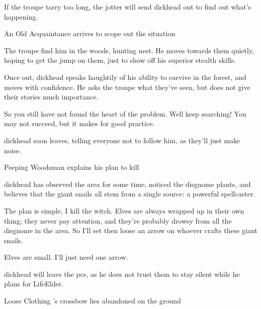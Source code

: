 
If the troupe tarry too long, the \gls{jotter} will send \gls{dickhead} out to find out what's happening.

{An Old Acquaintance}%
{ arrives to scope out the situation}%

The troupe find him in the woods, hunting  nest.
He moves towards them quietly, hoping to get the jump on them, just to show off his superior stealth \glspl{skill}.

Once out, \gls{dickhead} speaks haughtily of his ability to survive in the forest, and moves with confidence.
He asks the troupe what they've seen, but does not give their stories much importance.

\begin{speechtext}
  So you still have not found the heart of the problem.
  Well keep searching!
  You may not succeed, but it makes for good practice.
\end{speechtext}

\Gls{dickhead} soon leaves, telling everyone not to follow him, as they'll just make noise.

\dickhead

{Peeping Woodsman}%
{ explains his plan to kill }%

\Gls{dickhead} has observed the area for some time, noticed the \gls{disgnome} plants, and believes that the giant snails all stem from a single source: a powerful spellcaster.

\begin{speechtext}
  The plan is simple, I kill the \gls{witch}.
  Elves are always wrapped up in their own thing; they never pay attention, and they're probably drowsy from all the \gls{disgnome} in the area.
  So I'll set  then loose an arrow on whoever crafts these giant snails.

  Elves are small.
  I'll just need one arrow.
\end{speechtext}

\Gls{dickhead} will leave the \glspl{pc}, as he does not trust them to stay silent while he plans  for \gls{LifeElder}.

{Loose Clothing}%
{'s crossbow lies abandoned on the ground}%

